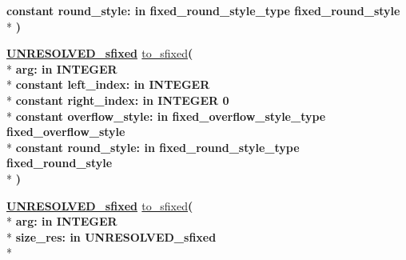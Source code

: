 \begin{DoxyCompactItemize}
{\bfseries {\bfseries \textcolor{keywordflow}{constant}\textcolor{vhdlchar}{ }}\textcolor{vhdlchar}{round\+\_\+style\+: }\textcolor{stringliteral}{in }\textcolor{vhdlchar}{fixed\+\_\+round\+\_\+style\+\_\+type     fixed\+\_\+round\+\_\+style}}\\*
{\bfseries  )} 
\item 
{\bfseries {\bfseries {\bfseries \hyperlink{classfixed__pkg_aa723b28a027c3c0f9bca02d75e8df4d6}{U\+N\+R\+E\+S\+O\+L\+V\+E\+D\+\_\+sfixed}} \textcolor{vhdlchar}{ }}} \hyperlink{classfixed__pkg_a440e389275888b28c0eff1c60223a3d0}{to\+\_\+sfixed}{\bfseries  ( }\\*
{\bfseries \textcolor{vhdlchar}{arg\+: }\textcolor{stringliteral}{in }{\bfseries \textcolor{comment}{I\+N\+T\+E\+G\+E\+R}\textcolor{vhdlchar}{ }}}\\*
{\bfseries {\bfseries \textcolor{keywordflow}{constant}\textcolor{vhdlchar}{ }}\textcolor{vhdlchar}{left\+\_\+index\+: }\textcolor{stringliteral}{in }{\bfseries \textcolor{comment}{I\+N\+T\+E\+G\+E\+R}\textcolor{vhdlchar}{ }}}\\*
{\bfseries {\bfseries \textcolor{keywordflow}{constant}\textcolor{vhdlchar}{ }}\textcolor{vhdlchar}{right\+\_\+index\+: }\textcolor{stringliteral}{in }\textcolor{vhdlchar}{I\+N\+T\+E\+G\+E\+R   0}}\\*
{\bfseries {\bfseries \textcolor{keywordflow}{constant}\textcolor{vhdlchar}{ }}\textcolor{vhdlchar}{overflow\+\_\+style\+: }\textcolor{stringliteral}{in }\textcolor{vhdlchar}{fixed\+\_\+overflow\+\_\+style\+\_\+type     fixed\+\_\+overflow\+\_\+style}}\\*
{\bfseries {\bfseries \textcolor{keywordflow}{constant}\textcolor{vhdlchar}{ }}\textcolor{vhdlchar}{round\+\_\+style\+: }\textcolor{stringliteral}{in }\textcolor{vhdlchar}{fixed\+\_\+round\+\_\+style\+\_\+type     fixed\+\_\+round\+\_\+style}}\\*
{\bfseries  )} 
\item 
{\bfseries {\bfseries {\bfseries \hyperlink{classfixed__pkg_aa723b28a027c3c0f9bca02d75e8df4d6}{U\+N\+R\+E\+S\+O\+L\+V\+E\+D\+\_\+sfixed}} \textcolor{vhdlchar}{ }}} \hyperlink{classfixed__pkg_a575822ec305f0e37fa911df9b379bf4c}{to\+\_\+sfixed}{\bfseries  ( }\\*
{\bfseries \textcolor{vhdlchar}{arg\+: }\textcolor{stringliteral}{in }{\bfseries \textcolor{comment}{I\+N\+T\+E\+G\+E\+R}\textcolor{vhdlchar}{ }}}\\*
{\bfseries \textcolor{vhdlchar}{size\+\_\+res\+: }\textcolor{stringliteral}{in }\textcolor{vhdlchar}{U\+N\+R\+E\+S\+O\+L\+V\+E\+D\+\_\+sfixed}}\\*

\end{DoxyCompactItemize}
